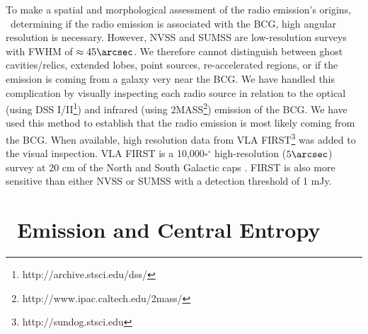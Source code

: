 \documentclass{emulateapj}
\begin{document}
To make a spatial and morphological assessment of the radio emission's
origins, \ie\ determining if the radio emission is associated with the
BCG, high angular resolution is necessary. However, NVSS and SUMSS are
low-resolution surveys with FWHM of $\approx 45\arcsec$. We therefore
cannot distinguish between ghost cavities/relics, extended lobes,
point sources, re-accelerated regions, or if the emission is coming
from a galaxy very near the BCG. We have handled this complication by
visually inspecting each radio source in relation to the optical
(using DSS I/II\footnote{http://archive.stsci.edu/dss/}) and infrared
(using 2MASS\footnote{http://www.ipac.caltech.edu/2mass/}) emission of
the BCG. We have used this method to establish that the radio emission
is most likely coming from the BCG. When available, high resolution
data from VLA FIRST\footnote{http://sundog.stsci.edu} was added to the
visual inspection. VLA FIRST is a 10,000$\square^\circ$
high-resolution ($5\arcsec$) survey at 20 cm of the North and South
Galactic caps \citep{first}. FIRST is also more sensitive than either
NVSS or SUMSS with a detection threshold of 1 mJy.

\section{\halpha\ Emission and Central Entropy}
\label{sec:sf}
\end{document}
